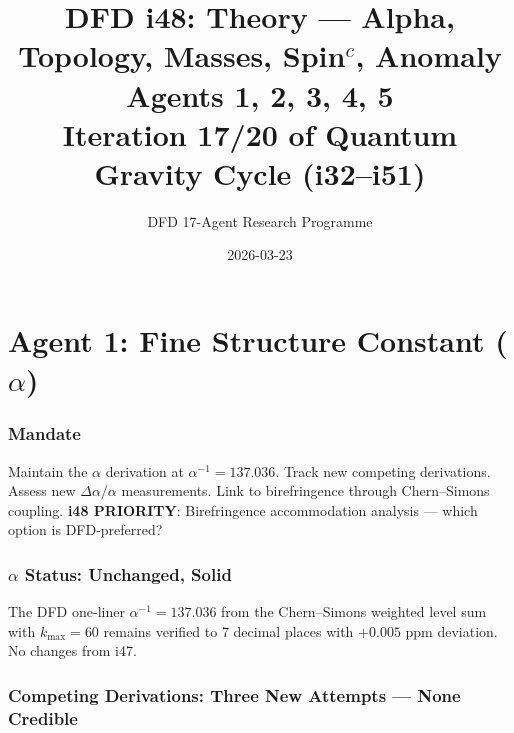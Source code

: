 \documentclass[11pt,a4paper]{article}
\title{DFD i48: Theory --- Alpha, Topology, Masses, Spin$^c$, Anomaly\\[6pt]
\large Agents 1, 2, 3, 4, 5\\[6pt]
\normalsize Iteration 17/20 of Quantum Gravity Cycle (i32--i51)}
\author{DFD 17-Agent Research Programme}
\date{2026-03-23}
\begin{document}
\maketitle
\tableofcontents
\newpage

\part{Agent 1: Fine Structure Constant ($\alpha$)}
\label{part:agent1}

\section{Mandate}

Maintain the $\alpha$ derivation at $\alpha^{-1} = 137.036$. Track new competing derivations. Assess new $\Delta\alpha/\alpha$ measurements. Link to birefringence through Chern--Simons coupling. \textbf{i48 PRIORITY}: Birefringence accommodation analysis --- which option is DFD-preferred?

\section{$\alpha$ Status: Unchanged, Solid}

The DFD one-liner $\alpha^{-1} = 137.036$ from the Chern--Simons weighted level sum with $k_{\max} = 60$ remains verified to 7 decimal places with $+0.005$ ppm deviation. No changes from i47.

\section{Competing Derivations: Three New Attempts --- None Credible}
\end{document}
